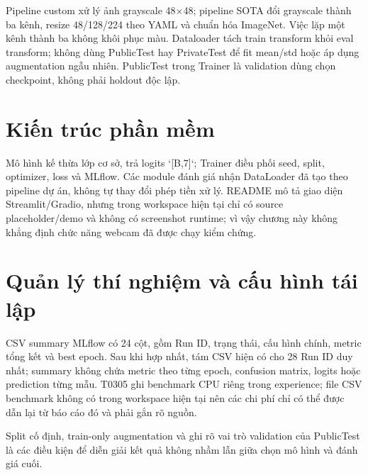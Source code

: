 Pipeline custom xử lý ảnh grayscale 48\ensuremath{\times}48; pipeline SOTA đổi grayscale thành ba kênh, resize 48/128/224 theo YAML và chuẩn hóa ImageNet. Việc lặp một kênh thành ba không khôi phục màu. Dataloader tách train transform khỏi eval transform; không dùng PublicTest hay PrivateTest để fit mean/std hoặc áp dụng augmentation ngẫu nhiên. PublicTest trong Trainer là validation dùng chọn checkpoint, không phải holdout độc lập.

\section{Kiến trúc phần mềm}
\begin{center}
\end{center}

Mô hình kế thừa lớp cơ sở, trả logits `[B,7]`; Trainer điều phối seed, split, optimizer, loss và MLflow. Các module đánh giá nhận DataLoader đã tạo theo pipeline dự án, không tự thay đổi phép tiền xử lý. README mô tả giao diện Streamlit/Gradio, nhưng trong workspace hiện tại chỉ có source placeholder/demo và không có screenshot runtime; vì vậy chương này không khẳng định chức năng webcam đã được chạy kiểm chứng.

\section{Quản lý thí nghiệm và cấu hình tái lập}
CSV summary MLflow có 24 cột, gồm Run ID, trạng thái, cấu hình chính, metric tổng kết và best epoch. Sau khi hợp nhất, tám CSV hiện có cho 28 Run ID duy nhất; summary không chứa metric theo từng epoch, confusion matrix, logits hoặc prediction từng mẫu. T0305 ghi benchmark CPU riêng trong experience; file CSV benchmark không có trong workspace hiện tại nên các chi phí chỉ có thể được dẫn lại từ báo cáo đó và phải gắn rõ nguồn.

\begin{calloutbox}
Split cố định, train-only augmentation và ghi rõ vai trò validation của PublicTest là các điều kiện để diễn giải kết quả không nhầm lẫn giữa chọn mô hình và đánh giá cuối.
\end{calloutbox}
